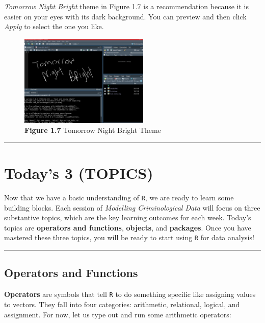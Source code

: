 \documentclass[
]{book}
\begin{document}
\emph{Tomorrow Night Bright} theme in Figure 1.7 is a recommendation because it is easier on your eyes with its dark background. You can preview and then click \emph{Apply} to select the one you like.

\begin{figure}
\centering
\includegraphics[width=0.55\textwidth,height=\textheight]{Images/tomorrow night bright.png}
\caption{\textbf{Figure 1.7} Tomorrow Night Bright Theme}
\end{figure}

\begin{center}\rule{0.5\linewidth}{0.5pt}\end{center}

\hypertarget{todays-3-topics}{%
\section{Today's 3 (TOPICS)}\label{todays-3-topics}}

Now that we have a basic understanding of \texttt{R}, we are ready to learn some building blocks. Each session of \emph{Modelling Criminological Data} will focus on three substantive topics, which are the key learning outcomes for each week. Today's topics are \textbf{operators and functions}, \textbf{objects}, and \textbf{packages}. Once you have mastered these three topics, you will be ready to start using \texttt{R} for data analysis!

\begin{center}\rule{0.5\linewidth}{0.5pt}\end{center}

\hypertarget{operators-and-functions}{%
\subsection{Operators and Functions}\label{operators-and-functions}}

\textbf{Operators} are symbols that tell \texttt{R} to do something specific like assigning values to vectors. They fall into four categories: arithmetic, relational, logical, and assignment. For now, let us type out and run some arithmetic operators:
\end{document}
